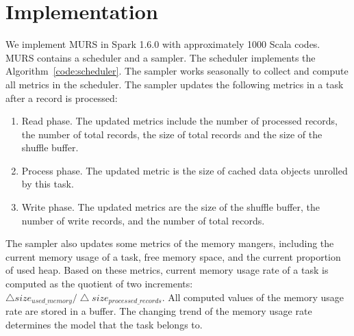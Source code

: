 \section{Implementation}

We implement MURS in Spark 1.6.0 with approximately 1000 Scala codes. MURS contains a scheduler and a sampler. The scheduler implements the Algorithm~\ref{code:scheduler}. 
The sampler works seasonally to collect and compute all metrics in the scheduler. 
The sampler updates the following metrics in a task after a record is processed:

\begin{enumerate}

\item Read phase. 
The updated metrics include the number of processed records, the number of total records, the size of total records and the size of the shuffle buffer.

\item Process phase. 
The updated metric is the size of cached data objects unrolled by this task.

\item Write phase. 
The updated metrics are the size of the shuffle buffer, the number of write records, and the number of total records. 

\end{enumerate}

The sampler also updates some metrics of the memory mangers, including the current memory usage of a task, free memory space, and the current proportion of used heap. Based on these metrics, current memory usage rate of a task is computed as the quotient of two increments: $\bigtriangleup size_{used\_memory} / \bigtriangleup size_{processed\_records}$. All computed values of the memory usage rate are stored in a buffer. The changing trend of the memory usage rate determines the model that the task belongs to.

